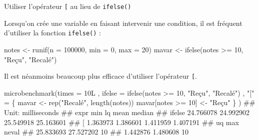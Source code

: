 \documentclass[12pt,handout,ignorenonframetext,]{beamer}
\newenvironment{Shaded}{}{}
\newcommand{\KeywordTok}[1]{\textcolor[rgb]{0.00,0.00,1.00}{{#1}}}
\newcommand{\DataTypeTok}[1]{{#1}}
\newcommand{\DecValTok}[1]{{#1}}
\newcommand{\StringTok}[1]{\textcolor[rgb]{0.00,0.50,0.50}{{#1}}}
\newcommand{\NormalTok}[1]{{#1}}
\renewenvironment{Shaded}{\begin{snugshade}}{\end{snugshade}}
\begin{document}
\begin{frame}[fragile]{Utiliser l'opérateur \texttt{{[}} au lieu de
\texttt{ifelse()}}

\small
Lorsqu'on crée une variable en faisant intervenir une condition, il est
fréquent d'utiliser la fonction \texttt{ifelse()} :

\footnotesize

\begin{Shaded}
\begin{Highlighting}[]
\NormalTok{notes <-}\StringTok{ }\KeywordTok{runif}\NormalTok{(}\DataTypeTok{n =} \DecValTok{100000}\NormalTok{, }\DataTypeTok{min =} \DecValTok{0}\NormalTok{, }\DataTypeTok{max =} \DecValTok{20}\NormalTok{)}
\NormalTok{mavar <-}\StringTok{ }\KeywordTok{ifelse}\NormalTok{(notes >=}\StringTok{ }\DecValTok{10}\NormalTok{, }\StringTok{"Reçu"}\NormalTok{, }\StringTok{"Recalé"}\NormalTok{)}
\end{Highlighting}
\end{Shaded}

\pause \small
Il est néanmoins beaucoup plus efficace d'utiliser l'opérateur
\texttt{{[}}.

\footnotesize

\begin{Shaded}
\begin{Highlighting}[]
\KeywordTok{microbenchmark}\NormalTok{(}\DataTypeTok{times =} \NormalTok{10L}
  \NormalTok{, }\DataTypeTok{ifelse =} \KeywordTok{ifelse}\NormalTok{(notes >=}\StringTok{ }\DecValTok{10}\NormalTok{, }\StringTok{"Reçu"}\NormalTok{, }\StringTok{"Recalé"}\NormalTok{)}
  \NormalTok{, }\StringTok{"["} \NormalTok{=}\StringTok{ }\NormalTok{\{}
    \NormalTok{mavar <-}\StringTok{ }\KeywordTok{rep}\NormalTok{(}\StringTok{"Recalé"}\NormalTok{, }\KeywordTok{length}\NormalTok{(notes))}
    \NormalTok{mavar[notes >=}\StringTok{ }\DecValTok{10}\NormalTok{] <-}\StringTok{ "Reçu"}
  \NormalTok{\} }
\NormalTok{)}
  \NormalTok{## Unit: milliseconds}
  \NormalTok{##    expr       min        lq      mean    median}
  \NormalTok{##  ifelse 24.766078 24.992902 25.549918 25.163601}
  \NormalTok{##       [  1.363973  1.386601  1.411959  1.407191}
  \NormalTok{##         uq       max neval}
  \NormalTok{##  25.833693 27.527202    10}
  \NormalTok{##   1.442876  1.480608    10}
\end{Highlighting}
\end{Shaded}

\end{frame}
\end{document}
